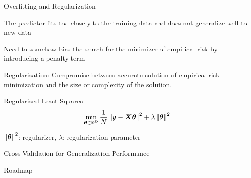 \documentclass[handout,fleqn,aspectratio=169]{beamer}
\begin{document}
\begin{frame}{Overfitting and Regularization}

\plitemsep 0.07in

\bci 

\item The predictor fits too closely to the training data and does not generalize well to new data

\item Need to somehow bias the search for the minimizer of empirical risk by introducing a penalty term

\item Regularization: Compromise between accurate solution of empirical risk minimization and the size or complexity of the solution.

\item \exam Regularized Least Squares
$$
\min_{\bm{\theta} \in {\mathbb R}^{D}} \frac{1}{N} \left \lVert \bm{y} - \bm{X}\bm{\theta} \right \rVert^2 + \lambda \left \lVert \bm{\theta} \right \rVert^2
$$
\bci
\item $\left \lVert \bm{\theta} \right \rVert^2$: regularizer, $\lambda$: regularization parameter
\eci

\eci
\end{frame}

\begin{frame}{Cross-Validation for Generalization Performance}

\bigskip



\end{frame}


\begin{frame}{Roadmap}

\plitemsep 0.1in

\bci 

\item {}
\item {} 
\item {}
\item {}

\eci
\end{frame}
\end{document}
